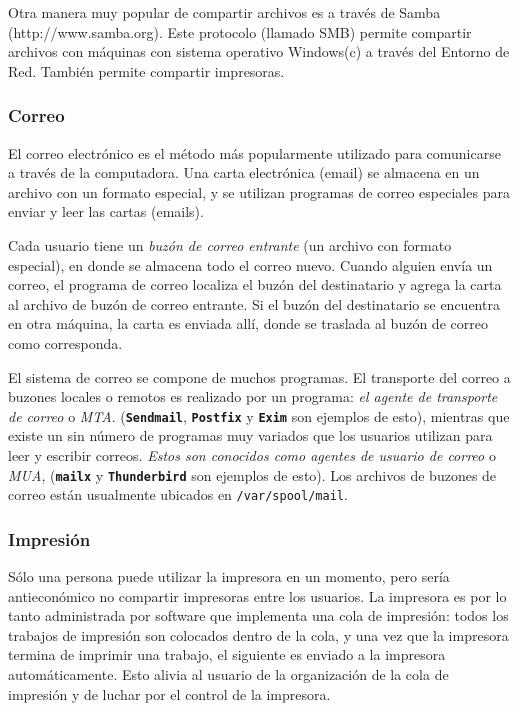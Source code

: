 \documentclass[12pt]{article}
\begin{document}
 Otra manera muy popular de compartir archivos es a través de Samba
(http://www.samba.org). Este protocolo
(llamado SMB) permite compartir archivos con máquinas con sistema operativo
Windows(c) a través del Entorno de Red. También permite compartir impresoras.  


\subsubsection{ Correo}

 El correo electrónico es el método más popularmente utilizado para
comunicarse a través de la computadora. Una carta electrónica (email) se almacena en un
archivo con un formato especial, y se utilizan programas de correo especiales
para enviar y leer las cartas (emails).  

 Cada usuario tiene un \textit{buzón de correo entrante} (un
archivo con formato especial), en donde se almacena todo el correo nuevo. Cuando
alguien  envía un correo, el programa de correo localiza el buzón del
destinatario y agrega la carta al archivo de buzón de correo entrante. Si el
buzón del destinatario se encuentra en otra máquina, la carta es enviada allí,
donde se traslada al buzón de correo como corresponda.  

 El sistema de correo se compone de muchos programas. El transporte del
correo a buzones locales o remotos es realizado por un programa: \textit{el
agente de transporte de correo} o \textit{MTA}.
(\texttt{\textbf{Sendmail}}, \texttt{\textbf{Postfix}} y \texttt{\textbf{Exim}} son ejemplos de
esto), mientras que existe un sin número de programas muy variados que los
usuarios utilizan para leer y escribir correos. \textit{Estos son conocidos
como agentes de usuario de correo }o \textit{MUA},
(\texttt{\textbf{mailx}} y \texttt{\textbf{Thunderbird}} son ejemplos de esto). Los
archivos de buzones de correo están usualmente ubicados en
\texttt{/var/spool/mail}.  


\subsubsection{Impresión}

 Sólo una persona puede utilizar la impresora en un momento, pero
sería antieconómico no compartir impresoras entre los usuarios. La impresora es
por lo tanto administrada por software que implementa una cola de impresión:
todos los trabajos de impresión son colocados dentro de la cola, y una vez que
la impresora termina de imprimir una trabajo, el siguiente es enviado a la
impresora automáticamente. Esto alivia al usuario de la organización de la cola
de impresión y de luchar por el control de la impresora.  
\end{document}
